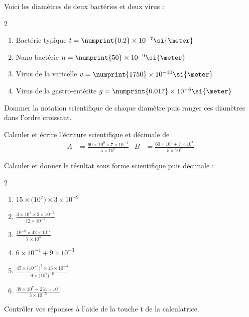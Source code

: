 \documentclass[main.tex]{subfiles}
\begin{document}
\begin{exercise}\hfill 
	
	Voici les diamètres de deux bactéries et deux virus :
\begin{multicols}{2} 
\begin{enumerate}[label={\textbullet}, leftmargin=*]  
	\item Bactérie typique $t=\numprint{0.2}\times10^{-7}\si{\meter}$
	\item Nano bactérie $n=\numprint{50}\times10^{-9}\si{\meter}$
	\item Virus de la varicelle $v=\numprint{1750}\times10^{-10}\si{\meter}$
	\item Virus de la gastro-entérite $g=\numprint{0.017}\times10^{-6}\si{\meter}$
\end{enumerate}
\end{multicols}
Donnner la notation scientifique de chaque diamètre puis ranger ces diamètres dans l'ordre  croissant.
\end{exercise}
\begin{example}  
	Calculer et écrire l'écriture scientifique et décimale de
	\begin{align*}
		A&= \frac{60\times 10^9 \times 7\times 10^{-4}}{5\times 10^2}
		&B&= \frac{60\times 10^9 + 7\times 10^{7}}{5\times 10^2} 
	\end{align*}  
\end{example} 

\begin{exercise}[à vous] Calculer et donner le résultat sous forme scientifique puis décimale :
	\begin{multicols}{2} 
	\begin{enumerate}[label={$\Alph*=$\rule{0pt}{2.0em}}, leftmargin=*]  
		\item $15\times \big(10^7\big)\times 3 \times 10^{-9}$  
		\item $\frac{3\times 10^3\times 2 \times 10^{-2}}{12\times 10^{-2}}$ 
		\item $\frac{10^{-8}\times 42 \times 10^{12}}{7\times 10^{5}}$  
		\item $6\times 10^{-4} + 9\times 10^{-3}$ 
		\item $\frac{45 \times \big(10^{-3}\big)^5 \times 13 \times 10^{-3}}{9\times \big(10^{2}\big)^{-6} }$ 
		\item $\frac{39\times 10^{7}-231\times 10^6}{3\times 10^{-5}}$ 
	\end{enumerate} 
\end{multicols} 
Contrôler vos réponses à l'aide de la touche {t} de la calculatrice.
\end{exercise} 
\end{document}

